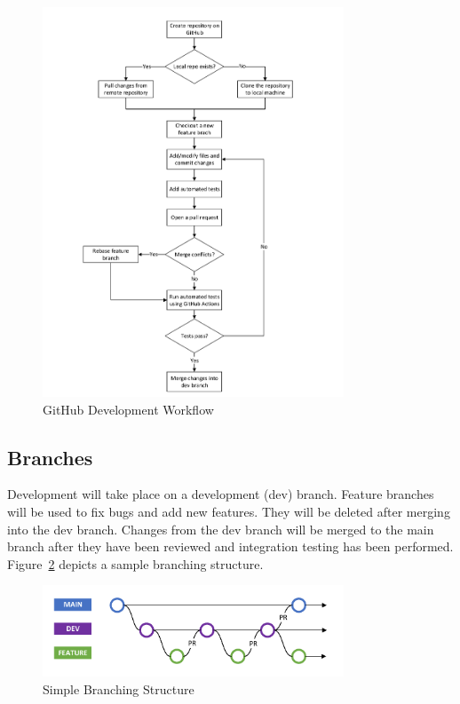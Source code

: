 \documentclass[titlepage]{article}
\begin{document}
\begin{figure} [H]
\begin{center}
	\includegraphics [width=0.8\textwidth] {Figures/GitHub Workflow.pdf}
	\caption{GitHub Development Workflow}
	\label{fig:Workflow}
	\end{center}
\end{figure}

\subsection{Branches}

Development will take place on a development (dev) branch. Feature branches will be used to fix bugs and add new features. They will be deleted after merging into the dev branch.  Changes from the dev branch will be merged to the main branch after they have been reviewed and integration testing has been performed. Figure~\ref{fig:Branches} depicts a sample branching structure.

\begin{figure} [H]
\begin{center}
	\includegraphics [width=0.8\textwidth] {Figures/GitHub Branches.pdf}
	\caption{Simple Branching Structure}
	\label{fig:Branches}
	\end{center}
\end{figure}
\end{document}
